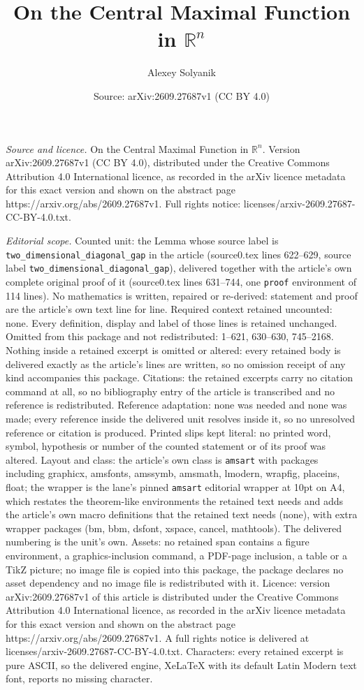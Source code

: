 \documentclass[10pt,a4paper]{amsart}
\title[On the Central Maximal Function in $\mathbb{R}^n$]{On the Central Maximal Function in $\mathbb{R}^n$}
\author{Alexey Solyanik}
\date{Source: arXiv:2609.27687v1 (CC BY 4.0)}
\begin{document}
\maketitle

\noindent\emph{Source and licence.} On the Central Maximal Function in $\mathbb{R}^n$. Version arXiv:2609.27687v1 (CC BY 4.0), distributed under the Creative Commons Attribution 4.0 International licence, as recorded in the arXiv licence metadata for this exact version and shown on the abstract page https://arxiv.org/abs/2609.27687v1. Full rights notice: licenses/arxiv-2609.27687-CC-BY-4.0.txt.\par\smallskip

\noindent\textit{Editorial scope.} Counted unit: the Lemma whose source label is \texttt{two\_dimensional\_diagonal\_gap} in the article (source0.tex lines 622--629, source label \texttt{two\_dimensional\_diagonal\_gap}), delivered together with the article's own complete original proof of it (source0.tex lines 631--744, one \texttt{proof} environment of 114 lines). No mathematics is written, repaired or re-derived: statement and proof are the article's own text line for line. Required context retained uncounted: none. Every definition, display and label of those lines is retained unchanged. Omitted from this package and not redistributed: 1--621, 630--630, 745--2168. Nothing inside a retained excerpt is omitted or altered: every retained body is delivered exactly as the article's lines are written, so no omission receipt of any kind accompanies this package. Citations: the retained excerpts carry no citation command at all, so no bibliography entry of the article is transcribed and no reference is redistributed. Reference adaptation: none was needed and none was made; every reference inside the delivered unit resolves inside it, so no unresolved reference or citation is produced. Printed slips kept literal: no printed word, symbol, hypothesis or number of the counted statement or of its proof was altered. Layout and class: the article's own class is \texttt{amsart} with packages including graphicx, amsfonts, amssymb, amsmath, lmodern, wrapfig, placeins, float; the wrapper is the lane's pinned \texttt{amsart} editorial wrapper at 10pt on A4, which restates the theorem-like environments the retained text needs and adds the article's own macro definitions that the retained text needs (none), with extra wrapper packages (bm, bbm, dsfont, xspace, cancel, mathtools). The delivered numbering is the unit's own. Assets: no retained span contains a figure environment, a graphics-inclusion command, a PDF-page inclusion, a table or a TikZ picture; no image file is copied into this package, the package declares no asset dependency and no image file is redistributed with it. Licence: version arXiv:2609.27687v1 of this article is distributed under the Creative Commons Attribution 4.0 International licence, as recorded in the arXiv licence metadata for this exact version and shown on the abstract page https://arxiv.org/abs/2609.27687v1. A full rights notice is delivered at licenses/arxiv-2609.27687-CC-BY-4.0.txt. Characters: every retained excerpt is pure ASCII, so the delivered engine, XeLaTeX with its default Latin Modern text font, reports no missing character.
\end{document}

